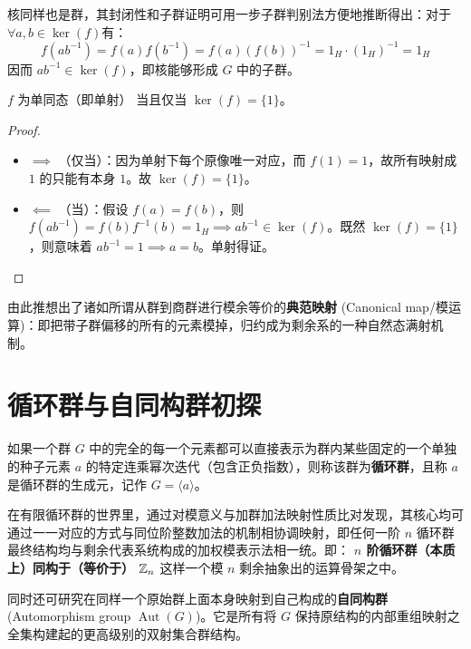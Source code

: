 \documentclass[11pt]{article}
\begin{document}
核同样也是群，其封闭性和子群证明可用一步子群判别法方便地推断得出：对于 $\forall a,b \in \ker(f)$有：
$$ f(ab^{-1}) = f(a)f(b^{-1}) = f(a)(f(b))^{-1} = 1_H \cdot (1_H)^{-1} = 1_H $$
因而 $ab^{-1} \in \ker(f)$，即核能够形成 $G$ 中的子群。

\begin{cntheorem}[同态单射定理]
    $f$ 为单同态（即单射） 当且仅当 $\ker(f) = \{1\}$。
\end{cntheorem}
\begin{proof}
    \begin{itemize}
        \item $\implies$ （仅当）：因为单射下每个原像唯一对应，而 $f(1) = 1$，故所有映射成 $1$ 的只能有本身 $1$。故 $\ker(f)=\{1\}$。
        \item $\impliedby$ （当）：假设 $f(a) = f(b)$，则 $f(ab^{-1}) = f(b)f^{-1}(b) = 1_H \implies ab^{-1} \in \ker(f)$。既然 $\ker(f)=\{1\}$，则意味着 $ab^{-1} = 1 \implies a = b$。单射得证。
    \end{itemize}
\end{proof}

由此推想出了诸如所谓从群到商群进行模余等价的\textbf{典范映射} (Canonical map/模运算)：即把带子群偏移的所有的元素模掉，归约成为剩余系的一种自然态满射机制。

\section{循环群与自同构群初探}

\begin{cndefinition}[循环群]
    如果一个群 $G$ 中的完全的每一个元素都可以直接表示为群内某些固定的一个单独的种子元素 $a$ 的特定连乘幂次迭代（包含正负指数），则称该群为\textbf{循环群}，且称 $a$ 是循环群的生成元，记作 $G = \langle a \rangle$。
\end{cndefinition}

在有限循环群的世界里，通过对模意义与加群加法映射性质比对发现，其核心均可通过一一对应的方式与同位阶整数加法的机制相协调映射，即任何一阶 $n$ 循环群最终结构均与剩余代表系统构成的加权模表示法相一统。即： \textbf{$n$ 阶循环群（本质上）同构于（等价于） $\mathbb{Z}_n$} 这样一个模 $n$ 剩余抽象出的运算骨架之中。

同时还可研究在同样一个原始群上面本身映射到自己构成的\textbf{自同构群} (Automorphism group $\operatorname{Aut}(G)$)。它是所有将 $G$ 保持原结构的内部重组映射之全集构建起的更高级别的双射集合群结构。
\end{document}
